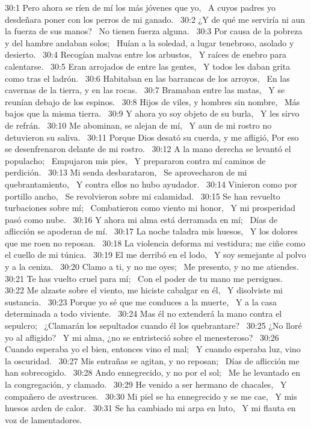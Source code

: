 30:1 Pero ahora se ríen de mí los más jóvenes que yo,  
A cuyos padres yo desdeñara poner con los perros de mi ganado.  
30:2 ¿Y de qué me serviría ni aun la fuerza de sus manos?  
No tienen fuerza alguna.  
30:3 Por causa de la pobreza y del hambre andaban solos;  
Huían a la soledad, a lugar tenebroso, asolado y desierto.  
30:4 Recogían malvas entre los arbustos,  
Y raíces de enebro para calentarse.  
30:5 Eran arrojados de entre las gentes,  
Y todos les daban grita como tras el ladrón.  
30:6 Habitaban en las barrancas de los arroyos,  
En las cavernas de la tierra, y en las rocas.  
30:7 Bramaban entre las matas,  
Y se reunían debajo de los espinos.  
30:8 Hijos de viles, y hombres sin nombre,  
Más bajos que la misma tierra.  
30:9 Y ahora yo soy objeto de su burla,  
Y les sirvo de refrán.  
30:10 Me abominan, se alejan de mí,  
Y aun de mi rostro no detuvieron su saliva.  
30:11 Porque Dios desató su cuerda, y me afligió, 
Por eso se desenfrenaron delante de mi rostro.  
30:12 A la mano derecha se levantó el populacho;  
Empujaron mis pies,  
Y prepararon contra mí caminos de perdición.  
30:13 Mi senda desbarataron,  
Se aprovecharon de mi quebrantamiento,  
Y contra ellos no hubo ayudador.  
30:14 Vinieron como por portillo ancho,  
Se revolvieron sobre mi calamidad.  
30:15 Se han revuelto turbaciones sobre mí;  
Combatieron como viento mi honor,  
Y mi prosperidad pasó como nube.  
30:16 Y ahora mi alma está derramada en mí;  
Días de aflicción se apoderan de mí.  
30:17 La noche taladra mis huesos,  
Y los dolores que me roen no reposan.  
30:18 La violencia deforma mi vestidura; me ciñe como el cuello de mi túnica.  
30:19 El me derribó en el lodo,  
Y soy semejante al polvo y a la ceniza.  
30:20 Clamo a ti, y no me oyes;  
Me presento, y no me atiendes.  
30:21 Te has vuelto cruel para mí;  
Con el poder de tu mano me persigues.  
30:22 Me alzaste sobre el viento, me hiciste cabalgar en él,  
Y disolviste mi sustancia.  
30:23 Porque yo sé que me conduces a la muerte,  
Y a la casa determinada a todo viviente.  
30:24 Mas él no extenderá la mano contra el sepulcro;  
¿Clamarán los sepultados cuando él los quebrantare?  
30:25 ¿No lloré yo al afligido?  
Y mi alma, ¿no se entristeció sobre el menesteroso?  
30:26 Cuando esperaba yo el bien, entonces vino el mal;  
Y cuando esperaba luz, vino la oscuridad.  
30:27 Mis entrañas se agitan, y no reposan;  
Días de aflicción me han sobrecogido.  
30:28 Ando ennegrecido, y no por el sol;  
Me he levantado en la congregación, y clamado.  
30:29 He venido a ser hermano de chacales,  
Y compañero de avestruces.  
30:30 Mi piel se ha ennegrecido y se me cae,  
Y mis huesos arden de calor.  
30:31 Se ha cambiado mi arpa en luto,  
Y mi flauta en voz de lamentadores.  
